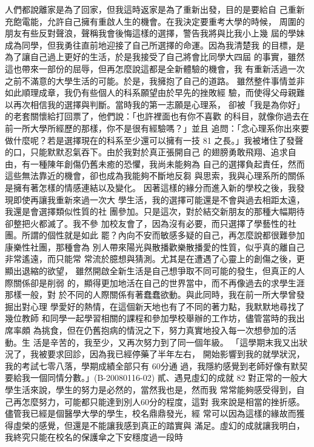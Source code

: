 人們都說離家是為了回家，但我這時返家是為了重新出發，目的是要給自
己重新充飽電能，允許自己擁有重啟人生的機會。在我決定要重考大學的時候，
周圍的朋友有些反對聲浪，聲稱我會後悔這樣的選擇，警告我將與比我小上幾
屆的學妹成為同學，但我勇往直前地迎接了自己所選擇的命運。因為我清楚我
的目標，是為了讓自己過上更好的生活，於是我接受了自己將會比同學大四屆
的事實，雖然這也帶來一部份的屈辱，但再怎麼說這都是全新體驗的機會，我
有重新活過一次之前不滿意的大學生活的可能。於是，我擁抱了自己的道路。
雖然整件事情並非如此順理成章，我仍有些個人的科系願望由於早先的挫敗經
驗，而使得父母親難以再次相信我的選擇與判斷。當時我的第一志願是心理系，
卻被「我是為你好」的老套關懷給打回票了，他們說：「也許裡面也有你不喜歡
的科目，就像你過去在前一所大學所經歷的那樣，你不是很有經驗嗎？」並且
追問：「念心理系你出來要做什麼呢？若是選擇現在的科系至少還可以擁有一技
81 
之長。」我被堵住了發聲的口，只能默默忍氣吞下。由於我對於真正張開自己
的翅膀勇敢飛翔、追求自由，有一種陳年創傷仍舊未癒的恐懼，我尚未能夠為
自己的選擇負起責任，然而這些無法靠近的機會，卻也成為我能夠不斷地反芻
與思索，我與心理系所的關係是擁有著怎樣的情感連結以及變化。 
因著這樣的緣分而進入新的學校之後，我發現即使再讓我重新來過一次大
學生活，我的選擇可能還是不會與過去相距太遠，我還是會選擇類似性質的社
團參加。只是這次，對於結交新朋友的那種大幅期待卻整把火都滅了。我不參
加校友會了，因為沒有必要，而只選擇了學藝性的社團。所謂的個性就是如此
罷？內向不安而敏感多疑的自己，再怎麼說都很難參加康樂性社團，那種會為
別人帶來陽光與散播歡樂散播愛的性質，似乎真的離自己非常遙遠，而只能常
常流於臆想與猜測。尤其是在遭遇了心靈上的創傷之後，更顯出退縮的欲望，
雖然開啟全新生活是自己想爭取不同可能的發生，但真正的人際關係卻是削弱
的，顯得更加地活在自己的世界當中，而不再像過去的求學生涯那樣一般，對
於不同的人際關係有著蠢蠢欲動。與此同時，我在前一所大學曾發掘出對心理
學愛好的熱情，在這個新天地也有了不同的著力點，我默默地尋找了幾位教師
和同學一起學習相關的課程和參加學校舉辦的工作坊，儘管當時的我出席率頗
為挑食，但在仍舊抱病的情況之下，努力真實地投入每一次想參加的活動。生
活是辛苦的，我至少，又再次努力到了同一個年級。 
「這學期末我又出狀況了，我被要求回診，因為我已經停藥了半年左右，
開始影響到我的就學狀況，我的考試七零八落，學期成績全部只有 60分通
過，我隱約感覺到老師好像有默契要給我一個同情分數。」(B-20080116-02) 
貳、遇見虛幻的成就 
82 
對正常的一般大學生活來說，學生的努力是必然的，當然我也是，然而我
常常能夠感受得到，自己再怎麼努力，可能都只能達到別人60分的程度，這對
我來說是相當的挫折感。儘管我已經是個醫學大學的學生，校名鼎鼎發光，經
常可以因為這樣的緣故而獲得虛榮的感覺，但還是不能讓我感到真正的踏實與
滿足。虛幻的成就讓我明白，我終究只能在校名的保護傘之下安穩度過一段時
